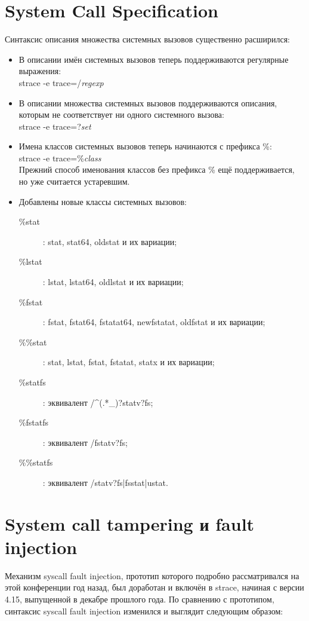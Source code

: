 \section{System Call Specification}
Синтаксис описания множества системных вызовов существенно расширился:
\begin{itemize}
\item В описании имён системных вызовов теперь поддерживаются регулярные выражения: \\
strace -e trace=/\textit{regexp}
\item В описании множества системных вызовов поддерживаются описания,
которым не соответствует ни одного системного вызова: \\
strace -e trace=?\textit{set}
\item Имена классов системных вызовов теперь начинаются с префикса \%: \\
strace -e trace=\%\textit{class} \\
Прежний способ именования классов без префикса \% ещё поддерживается,
но уже считается устаревшим.
\item Добавлены новые классы системных вызовов:
\begin{description}
	\item[\%stat]: stat, stat64, oldstat и их вариации;
	\item[\%lstat]: lstat, lstat64, oldlstat и их вариации;
	\item[\%fstat]: fstat, fstat64, fstatat64, newfstatat, oldfstat и их вариации;
	\item[\%\%stat]: stat, lstat, fstat, fstatat, statx и их вариации;
	\item[\%statfs]: эквивалент /\textasciicircum(.*\_)?statv?fs;
	\item[\%fstatfs]: эквивалент /fstatv?fs;
	\item[\%\%statfs]: эквивалент /statv?fs|fsstat|ustat.
\end{description}
\end{itemize}

\section{System call tampering и fault injection}
Механизм syscall fault injection, прототип которого подробно рассматривался на
этой конференции год назад, был доработан и включён в strace, начиная с версии
4.15, выпущенной в декабре прошлого года.  По сравнению с прототипом, синтаксис
syscall fault injection изменился и выглядит следующим образом:

